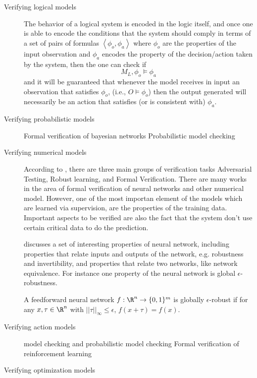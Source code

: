  \begin{description}
 \item[Verifying logical models] The behavior of a logical system is
   encoded in the logic itself, and once one is able to encode the
   conditions that the system should comply in terms of a set of pairs
   of formulas $\left<\phi_o,\phi_a\right>$ where $\phi_o$ are the
   properties of the input observation and $\phi_a$ encodes the
   property of the decision/action taken by the system, then the one
   can check if 
   $$
   M_L, \phi_o \models \phi_a
   $$
   and it will be guaranteed that whenever the model receives in input
   an observation that satisfies $\phi_o$, (i.e., $O\models \phi_o$)
   then the output generated will necessarily be an action that
   satisfies (or is consistent with) $\phi_a$.
   
 \item[Verifying probabilistic models]
   Formal verification of bayesian networks \cite{pmlr-v72-shih18a}
   Probabilistic model checking \cite{kwiatkowska2018probabilistic}

 \item[Verifying numerical models] According to
   \cite{kohli2019towards}, there are three main groups of
   verification tasks Adversarial Testing, Robust learning, and Formal
   Verification. There are many works in the area of formal
   verification of neural networks and other numerical model.
   However, one of the most importan element of the models which are
   learned via supervision, are the properties of the training data.
   Important aspects to be verified are also the fact that the system
   don't use certain critical data to do the prediction.

   \cite{narodytska2018formal} discusses a set of interesting
   properties of neural network, including properties that relate
   inputs and outputs of the network, e.g. robustness and
   invertibility, and properties that relate two networks, like
   network equivalence. For instance one property of the neural
   network is global $\epsilon$-robustness. 

   A feedforward neural network $f:\R^n\rightarrow \{0,1\}^m$ is
   globally $\epsilon$-robust if for any $x,\tau\in\R^n$ with
   $||\tau||_{\infty} \leq \epsilon$, $f(x+\tau)=f(x)$. 
   
 \item[Verifying action models]
   model checking \cite{clarke2018introduction} and
   probabilistic model checking \cite{kwiatkowska2018probabilistic}
   Formal verification of reinforcement learning
   \cite{van2017challenges}
   
 \item[Verifying optimization models]
   
\end{description}

